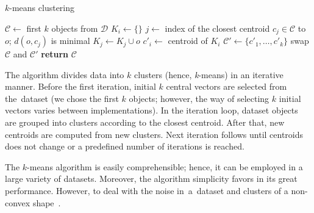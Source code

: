 \begin{algorithm}[t]
	\caption{$k$-means clustering }
	\label{alg01:kmeans}
	\begin{algorithmic}[1]
		\State $\mathcal{C} \gets$ first $k$ objects from  $\mathcal{D}$ 
		\Repeat
				\State $K_i \gets \{\}$
			\EndFor
				\State $j \gets$ index of the closest centroid $c_j \in \mathcal{C}$ to $o$; $d(o,c_j)$ is minimal
				\State $K_{j} \gets K_{j} \cup o$ 
			\EndFor
				\State $c'_i \gets$ centroid of $K_i$ 
			\EndFor
			\State $\mathcal{C}' \gets \{c'_1,\dots,c'_k\}$
			\State swap $\mathcal{C}$ and $\mathcal{C}'$
		\State \textbf{return} $\mathcal{C}$
		\EndProcedure
	\end{algorithmic}
\end{algorithm}


The algorithm divides data into $k$ clusters (hence, \emph{k}-means) in an iterative manner. Before the first iteration, initial $k$ central vectors are selected from the~dataset (we chose the first $k$ objects; however, the way of selecting $k$ initial vectors varies between 
implementations). In the iteration loop, dataset objects are grouped into clusters according to the closest centroid. After that, new centroids are computed from new clusters. Next iteration follows until centroids does not change or a predefined number of iterations is reached. 

The $k$-means algorithm is easily comprehensible; hence, it can be employed in a large variety of datasets. Moreover, the algorithm simplicity favors in its great performance. However,  to deal with the noise in~a~dataset and clusters of a non-convex shape~\cite{uppada2014centroid}.
  


